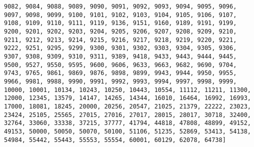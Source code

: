 \begin{lstlisting}[basicstyle=\scriptsize]
9082, 9084, 9088, 9089, 9090, 9091, 9092, 9093, 9094, 9095, 9096, 9097, 9098, 9099, 9100, 9101, 9102, 9103, 9104, 9105, 9106, 9107, 9108, 9109, 9110, 9111, 9119, 9136, 9151, 9160, 9189, 9191, 9199, 9200, 9201, 9202, 9203, 9204, 9205, 9206, 9207, 9208, 9209, 9210, 9211, 9212, 9213, 9214, 9215, 9216, 9217, 9218, 9219, 9220, 9221, 9222, 9251, 9295, 9299, 9300, 9301, 9302, 9303, 9304, 9305, 9306, 9307, 9308, 9309, 9310, 9311, 9389, 9418, 9433, 9443, 9444, 9445, 9500, 9527, 9550, 9595, 9600, 9606, 9633, 9663, 9682, 9690, 9704, 9743, 9765, 9861, 9869, 9876, 9898, 9899, 9943, 9944, 9950, 9955, 9966, 9981, 9988, 9990, 9991, 9992, 9993, 9994, 9997, 9998, 9999, 10000, 10001, 10134, 10243, 10250, 10443, 10554, 11112, 11211, 11300, 12000, 12345, 13579, 14147, 14265, 14344, 16010, 16464, 16992, 16993, 17000, 18081, 18245, 20000, 20256, 20547, 21025, 21379, 22222, 23023, 23424, 25105, 25565, 27015, 27016, 27017, 28015, 28017, 30718, 32400, 32764, 33060, 33338, 37215, 37777, 41794, 44818, 47808, 48899, 49152, 49153, 50000, 50050, 50070, 50100, 51106, 51235, 52869, 53413, 54138, 54984, 55442, 55443, 55553, 55554, 60001, 60129, 62078, 64738]
\end{lstlisting}
    